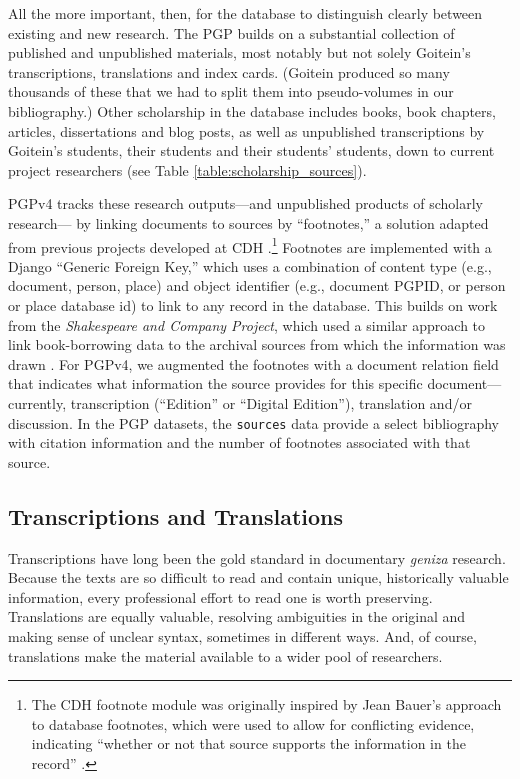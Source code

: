 \documentclass{article}
\begin{document}
All the more important, then, for the database to distinguish clearly between existing and new research. The PGP builds on a substantial collection of published and unpublished materials, most notably but not solely Goitein’s transcriptions, translations and index cards. (Goitein produced so many thousands of these that we had to split them into pseudo-volumes in our bibliography.) Other scholarship in the database includes books, book chapters, articles, dissertations and blog posts, as well as unpublished transcriptions by Goitein’s students, their students and their students’ students, down to current project researchers (see Table \ref{table:scholarship_sources}). 

PGPv4 tracks these research outputs—and unpublished products of scholarly research— by linking documents to sources by ``footnotes,'' a solution adapted from previous projects developed at CDH \autocite{koeser_princeton-cdhmep-django_2022, koeser_derrida-django_2021}.\footnote{The CDH footnote module was originally inspired by Jean Bauer’s approach to database footnotes, which were used to allow for conflicting evidence, indicating “whether or not that source supports the information in the record” \autocite{noauthor_tales_2012}.} Footnotes are implemented with a Django “Generic Foreign Key,” which uses a combination of content type (e.g., document, person, place) and object identifier (e.g., document PGPID, or person or place database id) to link to any record in the database. This builds on work from the \textit{Shakespeare and Company Project}, which used a similar approach to link book-borrowing data to the archival sources from which the information was drawn \autocite[18]{kotin_shakespeare_2022}. For PGPv4, we augmented the footnotes with a document relation field that indicates what information the source provides for this specific document—currently, transcription (“Edition” or “Digital Edition”), translation and/or discussion. In the PGP datasets, the \texttt{sources} data provide a select bibliography with citation information and the number of footnotes associated with that source.

\subsection{Transcriptions and Translations}
Transcriptions have long been the gold standard in documentary \textit{geniza} research. Because the texts are so difficult to read and contain unique, historically valuable information, every professional effort to read one is worth preserving. Translations are equally valuable, resolving ambiguities in the original and making sense of unclear syntax, sometimes in different ways. And, of course, translations make the material available to a wider pool of researchers.
\end{document}
